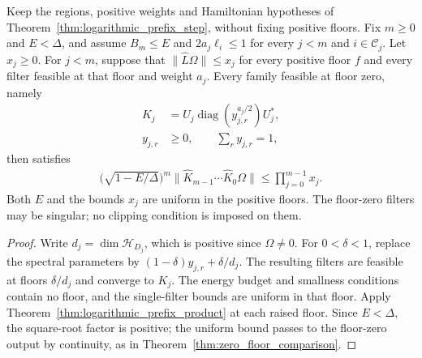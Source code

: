 \begin{theorem}
    \label{thm:logarithmic_zero_floor_comparison}
    \leanok
    Keep the regions, positive weights and Hamiltonian hypotheses
    of Theorem~\ref{thm:logarithmic_prefix_step}, without fixing
    positive floors. Fix $m\ge0$ and $E<\Delta$, and assume
    $B_m\le E$ and $2a_j\ell_i\le1$ for every $j<m$ and
    $i\in\mathcal C_j$. Let $x_j\ge0$. For $j<m$, suppose that
    $\lVert\widehat L\Omega\rVert\le x_j$ for every positive
    floor $f$ and every filter feasible at that floor and weight
    $a_j$. Every family feasible at floor zero, namely
    \begin{align*}
        K_j     & =U_j\operatorname{diag}(y_{j,r}^{a_j/2})U_j^*, \\
        y_{j,r} & \ge0,\qquad \sum_r y_{j,r}=1,
    \end{align*}
    then satisfies
    \begin{align*}
        \bigl(\sqrt{1-E/\Delta}\bigr)^m
        \lVert\widehat K_{m-1}\cdots\widehat K_0\Omega\rVert
        \le\prod_{j=0}^{m-1}x_j.
    \end{align*}
    Both $E$ and the bounds $x_j$ are uniform in the positive
    floors. The floor-zero filters may be singular; no clipping
    condition is imposed on them.
\end{theorem}
\begin{proof}
    \leanok
    Write $d_j=\dim\mathcal H_{D_j}$, which is positive since
    $\Omega\ne0$. For $0<\delta<1$, replace the spectral parameters by
    $(1-\delta)y_{j,r}+\delta/d_j$. The resulting filters are
    feasible at floors $\delta/d_j$ and converge to $K_j$.
    The energy budget and smallness conditions contain no floor,
    and the single-filter bounds are uniform in that floor.
    Apply Theorem~\ref{thm:logarithmic_prefix_product} at each
    raised floor. Since $E<\Delta$, the square-root factor is
    positive; the uniform bound passes to the floor-zero output
    by continuity, as in Theorem~\ref{thm:zero_floor_comparison}.
\end{proof}


